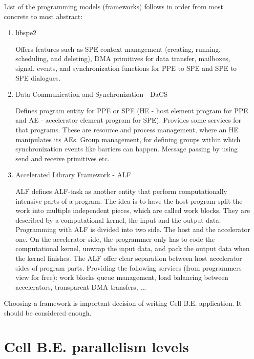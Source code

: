 List of the programming models (frameworks) follows in order from most concrete to most abstract:
\begin{enumerate}
\item {libspe2}
\par
Offers features such as SPE context management (creating, running, scheduling, and deleting), DMA primitives for data transfer, mailboxes, signal, events, and synchronization functions for PPE to SPE and SPE to SPE dialogues.

\item {Data Communication and Synchronization - DaCS}
\par
Defines program entity for PPE or SPE (HE - host element program for PPE and AE - accelerator element program for SPE).
Provides some services for that programs.
These are resource and process management, where an HE manipulates its AEs.
Group management, for defining groups within which synchronization events like barriers can happen.
Message passing by using send and receive primitives etc.

\item {Accelerated Library Framework - ALF}
\par
ALF defines ALF-task as another entity that perform computationally intensive parts of a program.
The idea is to have the host program split the work into multiple independent pieces, which are called work blocks.
They are described by a computational kernel, the input and the output data. Programming with ALF is divided into two side.
The host and the accelerator one.
On the accelerator side, the programmer only has to code the computational kernel, unwrap the input data, and pack the output data when the kernel finishes.
The ALF offer clear separation between host accelerator sides of program parts.
Providing the following services (from programmers view for free): work blocks queue management, load balancing between accelerators, transparent DMA transfers, ...

\end{enumerate}

Choosing a framework is important decision of writing Cell B.E. application.
 It should be considered enough.

\section {Cell B.E. parallelism levels}

